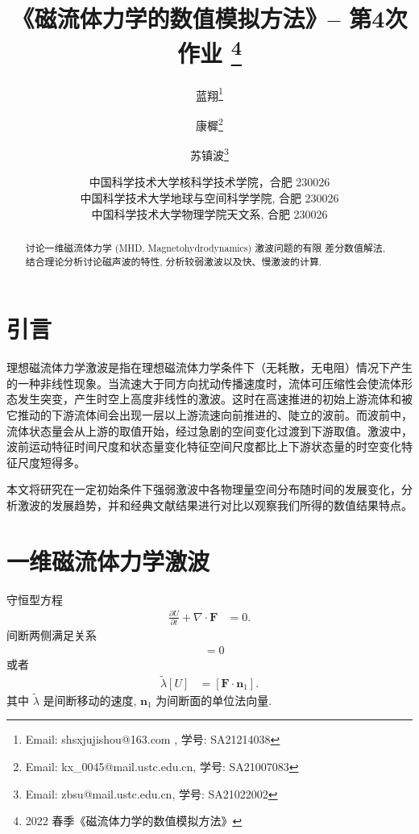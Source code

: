 \documentclass{article}
\begin{document}
\renewcommand{\refname}{参考文献}
\renewcommand{\figurename}{图}
\renewcommand{\abstractname}{摘要}
\def\due{2022 年 3 月 7 日周一 8:40}

\title{《磁流体力学的数值模拟方法》-- 第4次作业 \footnote{2022 春季《磁流体力学的数值模拟方法》}}


\author{蓝翔\footnote{Email: shsxjujishou@163.com
, 学号: SA21214038}
\and
康樨\footnote{Email: kx\_0045@mail.ustc.edu.cn, 学号: SA21007083}
\and
苏镇波\footnote{Email: zbsu@mail.ustc.edu.cn, 学号: SA21022002}
}

\date{%
\scriptsize%
中国科学技术大学核科学技术学院，合肥 230026\\
中国科学技术大学地球与空间科学学院, 合肥 230026\\
中国科学技术大学物理学院天文系, 合肥 230026
%
}

\maketitle

\begin{abstract}
讨论一维磁流体力学 (MHD, Magnetohydrodynamics) 激波问题的有限
差分数值解法, 结合理论分析讨论磁声波的特性, 分析较弱激波以及快、慢激波的计算.

\end{abstract}

\section{引言}
理想磁流体力学激波是指在理想磁流体力学条件下（无耗散，无电阻）情况下产生的一种非线性现象。当流速大于同方向扰动传播速度时，流体可压缩性会使流体形态发生突变，产生时空上高度非线性的激波。这时在高速推进的初始上游流体和被它推动的下游流体间会出现一层以上游流速向前推进的、陡立的波前。而波前中，流体状态量会从上游的取值开始，经过急剧的空间变化过渡到下游取值。激波中，波前运动特征时间尺度和状态量变化特征空间尺度都比上下游状态量的时空变化特征尺度短得多。
\par
本文将研究在一定初始条件下强弱激波中各物理量空间分布随时间的发展变化，分析激波的发展趋势，并和经典文献结果进行对比以观察我们所得的数值结果特点。
\section{一维磁流体力学激波\citep{Jeffrey1964}}
守恒型方程
\begin{align}
\frac{\partial U}{\partial t} + \nabla \cdot \boldsymbol{F} &= 0. \label{Eqn:3.1.6}
\end{align}
间断两侧满足关系
\begin{align}
[\tilde{\lambda} U - \boldsymbol{F} \cdot \boldsymbol{n}_1] &= 0 \label{Eqn:3.1.11}
\end{align}
或者
\begin{align}
\tilde{\lambda} [U] &= [\boldsymbol{F} \cdot \boldsymbol{n}_1]. \label{Eqn:3.1.11a}
\end{align}
其中 $\tilde{\lambda}$ 是间断移动的速度, $\boldsymbol{n}_1$ 为间断面的单位法向量.
\end{document}
